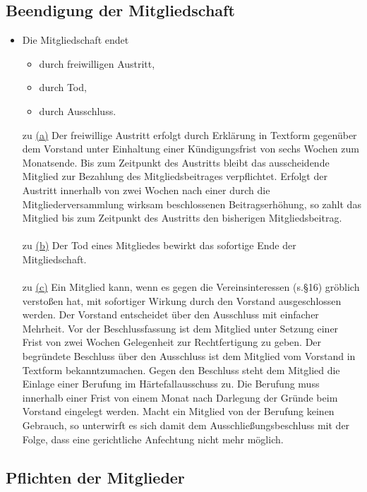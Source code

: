 \documentclass[12pt,paper=a4,ngerman]{report}
\begin{document}
\subsection{Beendigung der Mitgliedschaft}

\begin{itemize}
    \item Die Mitgliedschaft endet
    \begin{itemize}
        \item durch freiwilligen Austritt,
        \item durch Tod,
        \item durch Ausschluss.
    \end{itemize}
    
    zu \hyperref[par-13]{(a)} Der freiwillige Austritt erfolgt durch Erklärung in Textform gegenüber dem Vorstand unter Einhaltung einer Kündigungsfrist von sechs Wochen zum Monatsende. Bis zum Zeitpunkt des Austritts bleibt das ausscheidende Mitglied zur Bezahlung des Mitgliedsbeitrages verpflichtet. Erfolgt der Austritt innerhalb von zwei Wochen nach einer durch die Mitgliederversammlung wirksam beschlossenen Beitragserhöhung, so zahlt das Mitglied bis zum Zeitpunkt des Austritts den bisherigen Mitgliedsbeitrag.
    \\
    \\
    zu \hyperref[par-13]{(b)} Der Tod eines Mitgliedes bewirkt das sofortige Ende der Mitgliedschaft.
    \\
    \\
    zu \hyperref[par-13]{(c)} Ein Mitglied kann, wenn es gegen die Vereinsinteressen (s.§16) gröblich verstoßen hat, mit sofortiger Wirkung durch den Vorstand ausgeschlossen werden. Der Vorstand entscheidet über den Ausschluss mit einfacher Mehrheit. Vor der Beschlussfassung ist dem Mitglied unter Setzung einer Frist von zwei Wochen Gelegenheit zur Rechtfertigung zu geben. Der begründete Beschluss über den Ausschluss ist dem Mitglied vom Vorstand in Textform bekanntzumachen. Gegen den Beschluss steht dem Mitglied die Einlage einer Berufung im Härtefallausschuss zu. Die Berufung muss innerhalb einer Frist von einem Monat nach Darlegung der Gründe beim Vorstand eingelegt werden. Macht ein Mitglied von der Berufung keinen Gebrauch, so unterwirft es sich damit dem Ausschließungsbeschluss mit der Folge, dass eine gerichtliche Anfechtung nicht mehr möglich.
\end{itemize}

\subsection{Pflichten der Mitglieder}
\end{document}
